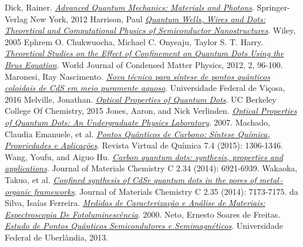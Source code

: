  Dick, Rainer. \href{http://www.springer.com/us/book/9781489990686}{\it Advanced Quantum Mechanics: Materials and Photons}. Springer-Verlag New York, 2012
 Harrison, Paul \href{http://www.wiley.com/WileyCDA/WileyTitle/productCd-0470010819.html}{\it Quantum Wells, Wires and Dots: Theoretical and Computational Physics of Semiconductor Nanostructures}. Wiley, 2005
 Ephrem O. Chukwuocha, Michael C. Onyeaju, Taylor S. T. Harry. \href{http://file.scirp.org/pdf/WJCMP20120200011_36451105.pdf}{\it Theoretical Studies on the Effect of Confinement on Quantum Dots Using the Brus Equation}. World Journal of Condensed Matter Physics, 2012, 2, 96-100.
 Maronesi, Ray Nascimento. \href{http://www.locus.ufv.br/handle/123456789/9775}{\it Nova técnica para síntese de pontos quânticos coloidais de CdS em meio puramente aquoso}. Universidade Federal de Viçosa, 2016
 Melville, Jonathan. \href{https://www.ocf.berkeley.edu/~jmlvll/lab-reports/quantumDots/quantumDots.pdf}{\it Optical Properties of Quantum Dots}. UC Berkeley College Of Chemistry, 2015
 Jones, Aaron, and Nick Verlinden. \href{https://web.wpi.edu/Pubs/E-project/Available/E-project-042607-125225/unrestricted/QuantumDots.pdf}{\it Optical Properties of Quantum Dots: An Undergraduate Physics Laboratory}. 2007.
 Machado, Claudia Emanuele, et al. \href{https://www.researchgate.net/profile/Marco_Schiavon2/publication/279939933_Carbon_Quantum_Dots_Chemical_Synthesis_Properties_and_Applications/links/559fe9f908aed84bedf44826.pdf}{\it Pontos Quânticos de Carbono: Síntese Química, Propriedades e Aplicações}. Revista Virtual de Química 7.4 (2015): 1306-1346.
 Wang, Youfu, and Aiguo Hu. \href{http://www.rsc.org/chemical-sciences-repository/articles/article/dr000000002036?doi=10.1039%2Fc4tc00988f}{\it Carbon quantum dots: synthesis, properties and applications}. Journal of Materials Chemistry C 2.34 (2014): 6921-6939.
 Wakaoka, Takuo, et al. \href{http://pubs.rsc.org/en/content/articlelanding/2014/tc/c4tc01136h#!divAbstract}{\it Confined synthesis of CdSe quantum dots in the pores of metal–organic frameworks}. Journal of Materials Chemistry C 2.35 (2014): 7173-7175.
 da Silva, Isaías Ferreira. \href{http://www.dsif.fee.unicamp.br/~furio/IE607A/Pl.pdf}{\it Medidas de Caracterização e Análise de Materiais: Espectroscopia De Fotoluminescência}. 2000.
 Neto, Ernesto Soares de Freitas. \href{https://repositorio.ufu.br/bitstream/123456789/15607/1/ErnestoSoares.pdf}{\it Estudo de Pontos Quânticos Semicondutores e Semimagnéticos}. Universidade Federal de Uberlândia, 2013.
